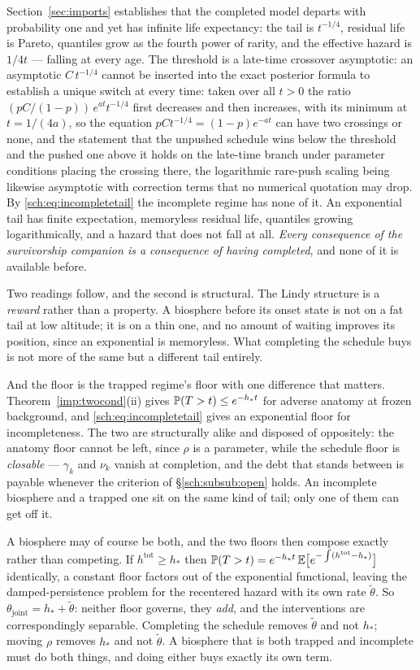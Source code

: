 Section~\ref{sec:imports} establishes that the completed model departs with
probability one and yet has infinite life expectancy: the tail is
$t^{-1/4}$, residual life is Pareto, quantiles grow as the fourth power
of rarity, and the effective hazard is $1/4t$ --- falling at every age. The threshold is a late-time crossover asymptotic: an asymptotic $C\,t^{-1/4}$ cannot be inserted into the exact posterior formula to establish a unique switch at every time: taken over all $t > 0$ the ratio $(pC/(1-p))\,e^{at}t^{-1/4}$ first decreases and then increases, with its minimum at $t = 1/(4a)$, so the equation $pCt^{-1/4} = (1-p)e^{-at}$ can have two crossings or none, and the statement that the unpushed schedule wins below the threshold and the pushed one above it holds on the late-time branch under parameter conditions placing the crossing there, the logarithmic rare-push scaling being likewise asymptotic with correction terms that no numerical quotation may drop.
By \eqref{sch:eq:incompletetail} the incomplete regime has none of it.
An exponential tail has finite expectation, memoryless residual life,
quantiles growing logarithmically, and a hazard that does not fall at
all. \emph{Every consequence of the survivorship companion \cite{GoldenSurvivorship} is a
consequence of having completed}, and none of it is available before.

Two readings follow, and the second is structural. The Lindy structure is a \emph{reward} rather than a property. A
biosphere before its onset state is not on a fat tail at low altitude;
it is on a thin one, and no amount of waiting improves its position,
since an exponential is memoryless. What completing the schedule buys is
not more of the same but a different tail entirely.

And the floor is the trapped regime's floor with one difference that
matters. Theorem~\ref{imp:twocond}(ii) gives $\mathbb{P}(T>t)\le e^{-h_\ast t}$
for adverse anatomy at frozen background, and \eqref{sch:eq:incompletetail}
gives an
exponential floor for incompleteness. The two are structurally alike and
disposed of oppositely: the anatomy floor cannot be left, since $\rho$ is
a parameter, while the schedule floor is \emph{closable} --- $\gamma_k$
and $\nu_k$ vanish at completion, and the debt that stands between is
payable whenever the criterion of \S\ref{sch:subsub:open} holds. An
incomplete biosphere and a trapped one sit on the same kind of tail; only
one of them can get off it.

A biosphere may of course be both, and the two floors then compose
exactly rather than competing. If $h^{\mathrm{tot}}\ge h_\ast$ then
$\mathbb{P}(T>t)=e^{-h_\ast t}\,\mathbb{E}\bigl[e^{-\int(h^{\mathrm{tot}}-h_\ast)}\bigr]$
identically, a constant floor factors out of the exponential
functional, leaving the damped-persistence problem for the recentered
hazard with its own rate $\tilde\theta$. So
$\theta_{\mathrm{joint}}=h_\ast+\tilde\theta$: neither floor governs, they
\emph{add}, and the interventions are correspondingly separable.
Completing the schedule removes $\tilde\theta$ and not $h_\ast$; moving
$\rho$ removes $h_\ast$ and not $\tilde\theta$. A biosphere that is both
trapped and incomplete must do both things, and doing either buys exactly
its own term.

